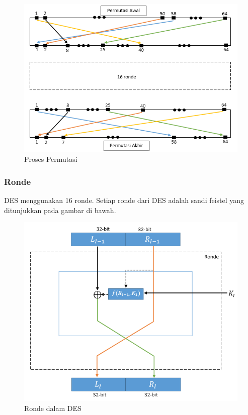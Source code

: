 \begin{figure}[h]
\includegraphics[]{Gambar/proses_permutasi}
\centering
\caption{Proses Permutasi}
\end{figure}

\subsubsection{Ronde}
DES menggunakan 16 ronde. Setiap ronde dari DES adalah sandi feistel yang ditunjukkan pada gambar di bawah.

\begin{figure}[h]
\includegraphics[]{Gambar/round}
\centering
\caption{Ronde dalam DES}
\end{figure}

